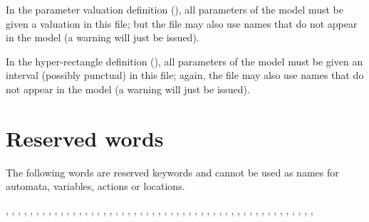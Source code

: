 

\begin{remark}
	In the parameter valuation definition (), all parameters of the model must be given a valuation in this file; but the file may also use names that do not appear in the model (a warning will just be issued).
\end{remark}

\begin{remark}
	In the hyper-rectangle definition (), all parameters of the model must be given an interval (possibly punctual) in this file; again, the file may also use names that do not appear in the model (a warning will just be issued).
\end{remark}





\section{Reserved words}

The following words are reserved keywords and cannot be used as names for automata, variables, actions or locations.

,
,
,
,
,
,
,
,
,
,
,
,
,
,
,
,
,
,
,
,
,
,
,
,
,
,
,
,
,
,
,
,
,
,
,
,
,
,
,
,
,
,
,
,
,
,
,
,
,
,
,






